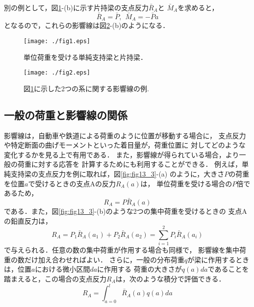 \documentclass[10pt,a4j]{jbook}
\begin{document}
別の例として，図\ref{fig:fig13_1}-(b)に示す片持梁の支点反力$\bar R_A$と
$\bar M_A$を求めると，
\begin{equation}
	\bar{R}_A=\bar{P}, \ \ 
	\bar{M}_A=-\bar{P} a
	\label{eqn:Mbar_2}
\end{equation}
となるので，これらの影響線は図\ref{fig:fig13_2}-(b)のようになる．
\begin{figure}[h]
	\begin{center}
	\texttt{[image: ./fig1.eps]} 
	\end{center}
	\caption{
		単位荷重を受ける単純支持梁と片持梁．
	} 
	\label{fig:fig13_1}
\end{figure}
\begin{figure}[h]
	\begin{center}
	\texttt{[image: ./fig2.eps]} 
	\end{center}
	\caption{
		図\ref{fig:fig13_1}に示した2つの系に関する影響線の例.
	} 
	\label{fig:fig13_2}
\end{figure}
\subsection{一般の荷重と影響線の関係}
影響線は，自動車や鉄道による荷重のように位置が移動する場合に，
支点反力や特定断面の曲げモーメントといった着目量が，荷重位置に
対してどのような変化するかを見る上で有用である．
また，影響線が得られている場合，より一般の荷重に対する応答を
計算するためにも利用することができる．
例えば，単純支持梁の支点反力を例に取れば，図\ref{fig:fig13_3}-(a)
のように，大きさ$P$の荷重を位置$a$で受けるときの支点Aの反力$R_A(a)$は，
単位荷重を受ける場合の$P$倍であるため，
\begin{equation}
	R_A =  P\bar{R}_A(a) 
\end{equation}
である．また，図\ref{fig:fig13_3}-(b)のような2つの集中荷重を受けるときの
支点Aの鉛直反力は，
\begin{equation}
	R_A =  
	P_1 \bar{R}_A(a_1)
	+
	P_2 \bar{R}_A(a_2)
	=
	\sum_{i=1}^2
	P_i \bar{R}_A(a_i)
\end{equation}
で与えられる．任意の数の集中荷重が作用する場合も同様で，
影響線を集中荷重の数だけ加え合わせればよい．
さらに，一般の分布荷重$q$が梁に作用するときは，位置$a$における微小区間$da$に作用する
荷重の大きさが$q(a)da$であることを踏まえると，この場合の支点反力$R_A$は，次のような積分で評価できる．
\begin{equation}
	R_A=\int_{a=0}^l \bar{R}_A(a)q(a)da 
\end{equation}
\end{document}
